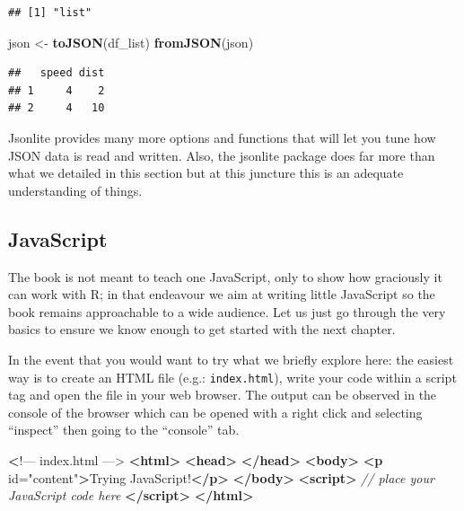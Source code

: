 \documentclass[
]{krantz}
\makeatletter
\newenvironment{Shaded}{\begin{snugshade}}{\end{snugshade}}
\newcommand{\CommentTok}[1]{\textcolor[rgb]{0.37,0.37,0.37}{\textit{#1}}}
\newcommand{\ErrorTok}[1]{\textcolor[rgb]{0.14,0.14,0.14}{\textbf{#1}}}
\newcommand{\KeywordTok}[1]{\textcolor[rgb]{0.27,0.27,0.27}{\textbf{#1}}}
\newcommand{\NormalTok}[1]{#1}
\newcommand{\OtherTok}[1]{\textcolor[rgb]{0.37,0.37,0.37}{#1}}
\newcommand{\StringTok}[1]{\textcolor[rgb]{0.5,0.5,0.5}{#1}}
\newenvironment{kframe}{%
\medskip{}
\setlength{\fboxsep}{.8em}
 \def\at@end@of@kframe{}%
 \ifinner\ifhmode%
  \def\at@end@of@kframe{\end{minipage}}%
  \begin{minipage}{\columnwidth}%
 \fi\fi%
 \def\FrameCommand##1{\hskip\@totalleftmargin \hskip-\fboxsep
 \colorbox{shadecolor}{##1}\hskip-\fboxsep
     \hskip-\linewidth \hskip-\@totalleftmargin \hskip\columnwidth}%
 \MakeFramed {\advance\hsize-\width
   \@totalleftmargin\z@ \linewidth\hsize
   \@setminipage}}%
 {\par\unskip\endMakeFramed%
 \at@end@of@kframe}
\renewenvironment{Shaded}{\begin{kframe}}{\end{kframe}}
\makeatother
\begin{document}
\begin{verbatim}
## [1] "list"
\end{verbatim}

\begin{Shaded}
\begin{Highlighting}[]
\NormalTok{json <{-}}\StringTok{ }\KeywordTok{toJSON}\NormalTok{(df\_list)}
\KeywordTok{fromJSON}\NormalTok{(json)}
\end{Highlighting}
\end{Shaded}

\begin{verbatim}
##   speed dist
## 1     4    2
## 2     4   10
\end{verbatim}

Jsonlite provides many more options and functions that will let you tune how JSON data is read and written. Also, the jsonlite package does far more than what we detailed in this section but at this juncture this is an adequate understanding of things.

\hypertarget{javascript}{%
\subsection*{JavaScript}\label{javascript}}


The book is not meant to teach one JavaScript, only to show how graciously it can work with R; in that endeavour we aim at writing little JavaScript so the book remains approachable to a wide audience. Let us just go through the very basics to ensure we know enough to get started with the next chapter.

In the event that you would want to try what we briefly explore here: the easiest way is to create an HTML file (e.g.: \texttt{index.html}), write your code within a script tag and open the file in your web browser. The output can be observed in the console of the browser which can be opened with a right click and selecting ``inspect'' then going to the ``console'' tab.

\begin{Shaded}
\begin{Highlighting}[]
 \ErrorTok{<}\NormalTok{!–– index.html ––>}
\KeywordTok{<html>}
  \KeywordTok{<head>}
  \KeywordTok{</head>}
  \KeywordTok{<body>}
    \KeywordTok{<p}\OtherTok{ id=}\StringTok{"content"}\KeywordTok{>}\NormalTok{Trying JavaScript!}\KeywordTok{</p>}
  \KeywordTok{</body>}
  \KeywordTok{<script>}
    \CommentTok{// place your JavaScript code here}
  \KeywordTok{</script>}
\KeywordTok{</html>}
\end{Highlighting}
\end{Shaded}
\end{document}
